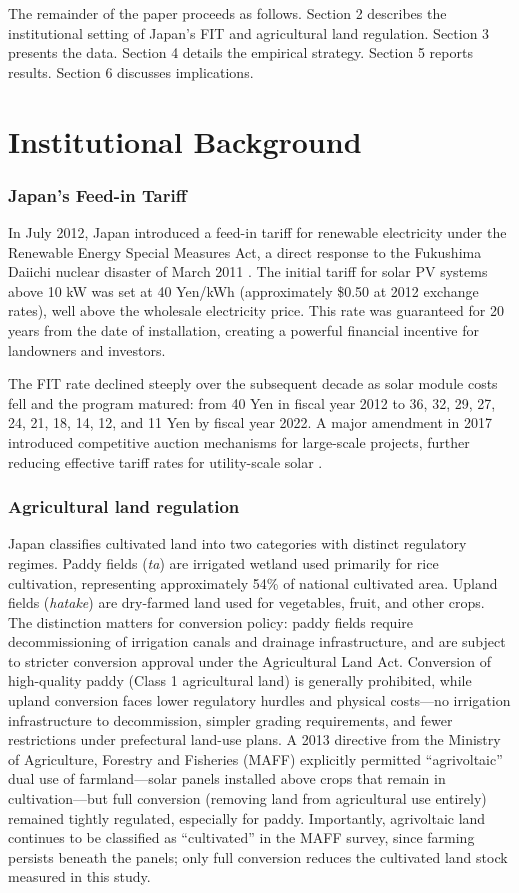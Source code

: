 \documentclass[12pt]{article}
\begin{document}
The remainder of the paper proceeds as follows. Section 2 describes the institutional setting of Japan's FIT and agricultural land regulation. Section 3 presents the data. Section 4 details the empirical strategy. Section 5 reports results. Section 6 discusses implications.


\section{Institutional Background}

\subsubsection*{Japan's Feed-in Tariff} In July 2012, Japan introduced a feed-in tariff for renewable electricity under the Renewable Energy Special Measures Act, a direct response to the Fukushima Daiichi nuclear disaster of March 2011 \citep{METI2022}. The initial tariff for solar PV systems above 10 kW was set at 40 Yen/kWh (approximately \$0.50 at 2012 exchange rates), well above the wholesale electricity price. This rate was guaranteed for 20 years from the date of installation, creating a powerful financial incentive for landowners and investors.

The FIT rate declined steeply over the subsequent decade as solar module costs fell and the program matured: from 40 Yen in fiscal year 2012 to 36, 32, 29, 27, 24, 21, 18, 14, 12, and 11 Yen by fiscal year 2022. A major amendment in 2017 introduced competitive auction mechanisms for large-scale projects, further reducing effective tariff rates for utility-scale solar \citep{METI2022}.

\subsubsection*{Agricultural land regulation} Japan classifies cultivated land into two categories with distinct regulatory regimes. Paddy fields (\textit{ta}) are irrigated wetland used primarily for rice cultivation, representing approximately 54\% of national cultivated area. Upland fields (\textit{hatake}) are dry-farmed land used for vegetables, fruit, and other crops. The distinction matters for conversion policy: paddy fields require decommissioning of irrigation canals and drainage infrastructure, and are subject to stricter conversion approval under the Agricultural Land Act. Conversion of high-quality paddy (Class 1 agricultural land) is generally prohibited, while upland conversion faces lower regulatory hurdles and physical costs---no irrigation infrastructure to decommission, simpler grading requirements, and fewer restrictions under prefectural land-use plans. A 2013 directive from the Ministry of Agriculture, Forestry and Fisheries (MAFF) explicitly permitted ``agrivoltaic'' dual use of farmland---solar panels installed above crops that remain in cultivation---but full conversion (removing land from agricultural use entirely) remained tightly regulated, especially for paddy. Importantly, agrivoltaic land continues to be classified as ``cultivated'' in the MAFF survey, since farming persists beneath the panels; only full conversion reduces the cultivated land stock measured in this study.
\end{document}
